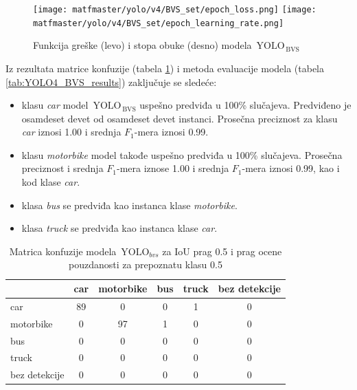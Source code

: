 \documentclass[12pt,oneside]{memoir}
\newcommand{\yolo}{\ensuremath{\,\textrm{YOLO}}}
\newcommand{\bvs}{\ensuremath{\,\textrm{BVS}}}
\begin{document}
\begin{figure}[!ht]
\centering
    \texttt{[image: matfmaster/yolo/v4/BVS\_set/epoch\_loss.png]}
    \texttt{[image: matfmaster/yolo/v4/BVS\_set/epoch\_learning\_rate.png]}
\caption{Funkcija greške (levo) i stopa obuke (desno) modela $\yolo_{\bvs}$ }
\label{fig:YOLO4_BVS_loss}
\end{figure}

Iz rezultata matrice konfuzije (tabela \ref{tab:YOLO4_BVS_confusion_matrix}) i metoda evaluacije modela (tabela \ref{tab:YOLO4_BVS_results}) zaključuje se sledeće:
\begin{itemize}
    \item klasu \textit{car} model $\yolo_{\bvs}$ uspešno predviđa u 100\% slučajeva. Predviđeno je osamdeset devet od osamdeset devet instanci. Prosečna preciznost za klasu \textit{car} iznosi 1.00 i srednja $F_1$-mera iznosi 0.99.
    \item klasu \textit{motorbike} model takođe uspešno predviđa u 100\% slučajeva. Prosečna preciznost i srednja $F_1$-mera iznose 1.00 i srednja $F_1$-mera iznosi 0.99, kao i kod klase \textit{car}.
    \item klasa \textit{bus} se predviđa kao instanca klase \textit{motorbike}.
    \item klasa \textit{truck} se predviđa kao instanca klase \textit{car}.
\end{itemize}


\begin{table}
    \begin{center}
    \caption{Matrica konfuzije modela $\yolo_{bvs}$ za IoU prag 0.5 i prag ocene pouzdanosti za prepoznatu klasu 0.5 }
    \begin{tabular}{ l|c|c|c|c|c|}
                  & car  & motorbike & bus & truck & bez detekcije \\ \hline
    car           & 89   & 0         & 0   & 1     & 0             \\ 
    motorbike     & 0    & 97        & 1   & 0     & 0             \\ 
    bus           & 0    & 0         & 0   & 0     & 0             \\ 
    truck         & 0    & 0         & 0   & 0     & 0             \\ 
    bez detekcije & 0    & 0         & 0   & 0     & 0             \\ \hline
    \end{tabular}
    \label{tab:YOLO4_BVS_confusion_matrix}
    \end{center}
\end{table}
\end{document}
